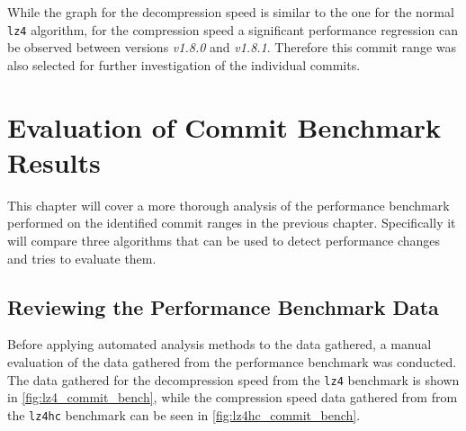 \documentclass[	runningheads,
				a4paper]{llncs}
\begin{document}
	While the graph for the decompression speed is similar to the one for the normal \texttt{lz4} algorithm, for the compression speed a significant performance regression can be observed between versions \textit{v1.8.0} and \textit{v1.8.1}. Therefore this commit range was also selected for further investigation of the individual commits.

\section{Evaluation of Commit Benchmark Results}
\label{sec:exp_evaluation}
This chapter will cover a more thorough analysis of the performance benchmark performed on the identified commit ranges in the previous chapter. Specifically it will compare three algorithms that can be used to detect performance changes and tries to evaluate them. 


\subsection{Reviewing the Performance Benchmark Data}
Before applying automated analysis methods to the data gathered, a manual evaluation of the data gathered from the performance benchmark was conducted. The data gathered for the decompression speed from the \texttt{lz4} benchmark is shown in \autoref{fig:lz4_commit_bench}, while the compression speed data gathered from from the \texttt{lz4hc} benchmark can be seen in \autoref{fig:lz4hc_commit_bench}.
\end{document}
